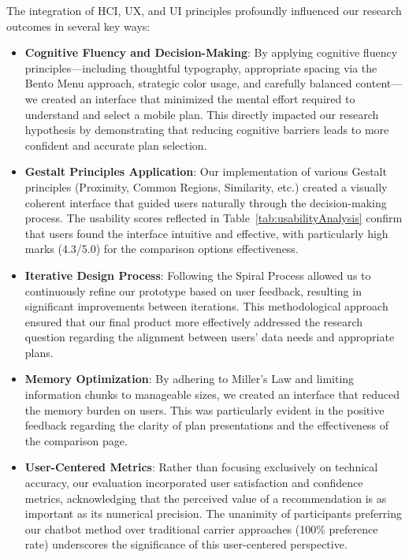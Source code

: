 \documentclass[conference]{IEEEtran}
\begin{document}
The integration of HCI, UX, and UI principles profoundly influenced our research outcomes in several key ways:

\begin{itemize}
    \item \textbf{Cognitive Fluency and Decision-Making}: By applying cognitive fluency principles—including thoughtful typography, appropriate spacing via the Bento Menu approach, strategic color usage, and carefully balanced content—we created an interface that minimized the mental effort required to understand and select a mobile plan. This directly impacted our research hypothesis by demonstrating that reducing cognitive barriers leads to more confident and accurate plan selection.
    
    \item \textbf{Gestalt Principles Application}: Our implementation of various Gestalt principles (Proximity, Common Regions, Similarity, etc.) created a visually coherent interface that guided users naturally through the decision-making process. The usability scores reflected in Table~\ref{tab:usabilityAnalysis} confirm that users found the interface intuitive and effective, with particularly high marks (4.3/5.0) for the comparison options effectiveness.
    
    \item \textbf{Iterative Design Process}: Following the Spiral Process allowed us to continuously refine our prototype based on user feedback, resulting in significant improvements between iterations. This methodological approach ensured that our final product more effectively addressed the research question regarding the alignment between users' data needs and appropriate plans.
    
    \item \textbf{Memory Optimization}: By adhering to Miller's Law and limiting information chunks to manageable sizes, we created an interface that reduced the memory burden on users. This was particularly evident in the positive feedback regarding the clarity of plan presentations and the effectiveness of the comparison page.
    
    \item \textbf{User-Centered Metrics}: Rather than focusing exclusively on technical accuracy, our evaluation incorporated user satisfaction and confidence metrics, acknowledging that the perceived value of a recommendation is as important as its numerical precision. The unanimity of participants preferring our chatbot method over traditional carrier approaches (100\% preference rate) underscores the significance of this user-centered perspective.
\end{itemize}
\end{document}
